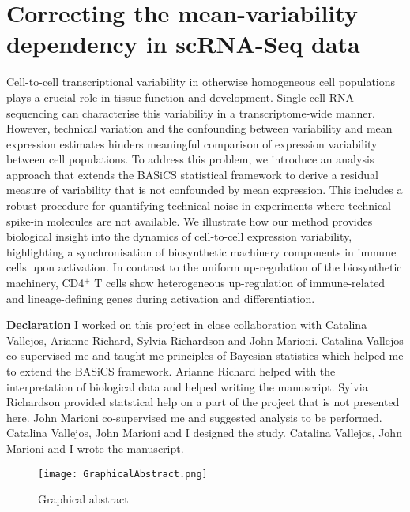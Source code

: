 
\chapter{Correcting the mean-variability dependency in scRNA-Seq data}  

\graphicspath{{Chapter2/Figures/}}

\begin{Abstract}
Cell-to-cell transcriptional variability in otherwise homogeneous cell populations plays a crucial role in tissue function and development. Single-cell RNA sequencing can characterise this variability in a transcriptome-wide manner. However, technical variation and the confounding between variability and mean expression estimates hinders meaningful comparison of expression variability between cell populations. To address this problem, we introduce an analysis approach that extends the BASiCS statistical framework to derive a residual measure of variability that is not confounded by mean expression. This includes a robust procedure for quantifying technical noise in experiments where technical spike-in molecules are not available.
We illustrate how our method provides biological insight into the dynamics of cell-to-cell expression variability, highlighting a synchronisation of biosynthetic machinery components in immune cells upon activation. In contrast to the uniform up-regulation of the biosynthetic machinery, CD4$^+$ T cells show heterogeneous up-regulation of immune-related and lineage-defining genes during activation and differentiation. 
\end{Abstract}

\newpage

\begin{Comment}
\textbf{Declaration} I worked on this project in close collaboration with Catalina Vallejos, Arianne Richard, Sylvia Richardson and John Marioni. Catalina Vallejos co-supervised me and taught me principles of Bayesian statistics which helped me to extend the BASiCS framework. Arianne Richard helped with the interpretation of biological data and helped writing the manuscript. Sylvia Richardson provided statstical help on a part of the project that is not presented here. John Marioni co-supervised me and suggested analysis to be performed. Catalina Vallejos, John Marioni and I designed the study. Catalina Vallejos, John Marioni and I wrote the manuscript.
\end{Comment}

\begin{figure}[hb]
\centering    
\texttt{[image: GraphicalAbstract.png]}
\vspace*{-10mm}
\caption*{Graphical abstract}
\end{figure}


\newpage


\newpage


